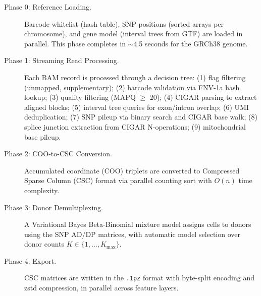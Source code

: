\documentclass[11pt,a4paper]{article}
\begin{document}
\begin{description}
    \item[Phase 0: Reference Loading.] Barcode whitelist (hash table), SNP positions (sorted arrays per chromosome), and gene model (interval trees from GTF) are loaded in parallel. This phase completes in $\sim$4.5 seconds for the GRCh38 genome.
    
    \item[Phase 1: Streaming Read Processing.] Each BAM record is processed through a decision tree: (1) flag filtering (unmapped, supplementary); (2) barcode validation via FNV-1a hash lookup; (3) quality filtering (MAPQ $\geq$ 20); (4) CIGAR parsing to extract aligned blocks; (5) interval tree queries for exon/intron overlap; (6) UMI deduplication; (7) SNP pileup via binary search and CIGAR base walk; (8) splice junction extraction from CIGAR N-operations; (9) mitochondrial base pileup.
    
    \item[Phase 2: COO-to-CSC Conversion.] Accumulated coordinate (COO) triplets are converted to Compressed Sparse Column (CSC) format via parallel counting sort with $O(n)$ time complexity.
    
    \item[Phase 3: Donor Demultiplexing.] A Variational Bayes Beta-Binomial mixture model assigns cells to donors using the SNP AD/DP matrices, with automatic model selection over donor counts $K \in \{1, \ldots, K_\text{max}\}$.
    
    \item[Phase 4: Export.] CSC matrices are written in the \texttt{.1pz} format with byte-split encoding and zstd compression, in parallel across feature layers.
\end{description}
\end{document}
